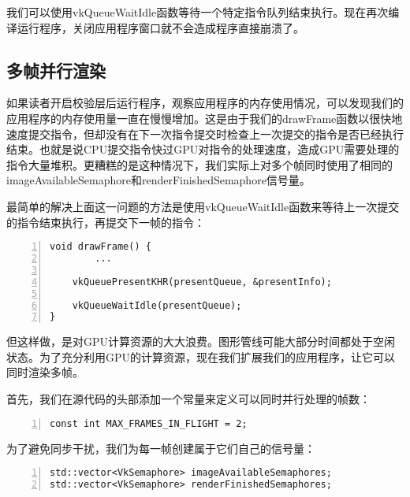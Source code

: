 \documentclass{ctexart}
\begin{document}
我们可以使用vkQueueWaitIdle函数等待一个特定指令队列结束执行。现在再次编译运行程序，关闭应用程序窗口就不会造成程序直接崩溃了。

\subsection{多帧并行渲染}

如果读者开启校验层后运行程序，观察应用程序的内存使用情况，可以发现我们的应用程序的内存使用量一直在慢慢增加。这是由于我们的drawFrame函数以很快地速度提交指令，但却没有在下一次指令提交时检查上一次提交的指令是否已经执行结束。也就是说CPU提交指令快过GPU对指令的处理速度，造成GPU需要处理的指令大量堆积。更糟糕的是这种情况下，我们实际上对多个帧同时使用了相同的imageAvailableSemaphore和renderFinishedSemaphore信号量。

最简单的解决上面这一问题的方法是使用vkQueueWaitIdle函数来等待上一次提交的指令结束执行，再提交下一帧的指令：

\begin{lstlisting}[language={[ANSI]C},keywordstyle=\color{blue!70},commentstyle=\color{red!50!green!50!blue!50},frame=shadowbox, rulesepcolor=\color{red!20!green!20!blue!20},basicstyle=\small,numbers=left, numberstyle=\tiny,breaklines=true]
void drawFrame() {
		...

	vkQueuePresentKHR(presentQueue, &presentInfo);

	vkQueueWaitIdle(presentQueue);
}
\end{lstlisting}

但这样做，是对GPU计算资源的大大浪费。图形管线可能大部分时间都处于空闲状态。为了充分利用GPU的计算资源，现在我们扩展我们的应用程序，让它可以同时渲染多帧。

首先，我们在源代码的头部添加一个常量来定义可以同时并行处理的帧数：

\begin{lstlisting}[language={[ANSI]C},keywordstyle=\color{blue!70},commentstyle=\color{red!50!green!50!blue!50},frame=shadowbox, rulesepcolor=\color{red!20!green!20!blue!20},basicstyle=\small,numbers=left, numberstyle=\tiny,breaklines=true]
const int MAX_FRAMES_IN_FLIGHT = 2;
\end{lstlisting}

为了避免同步干扰，我们为每一帧创建属于它们自己的信号量：

\begin{lstlisting}[language={[ANSI]C},keywordstyle=\color{blue!70},commentstyle=\color{red!50!green!50!blue!50},frame=shadowbox, rulesepcolor=\color{red!20!green!20!blue!20},basicstyle=\small,numbers=left, numberstyle=\tiny,breaklines=true]
std::vector<VkSemaphore> imageAvailableSemaphores;
std::vector<VkSemaphore> renderFinishedSemaphores;
\end{lstlisting}
\end{document}
